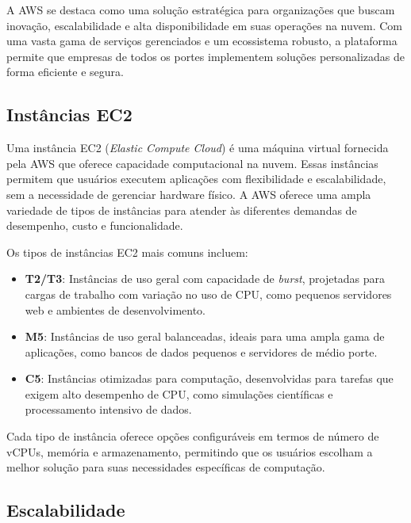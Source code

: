 A AWS se destaca como uma solução estratégica para organizações que buscam inovação, escalabilidade e alta disponibilidade em suas operações na nuvem. Com uma vasta gama de serviços gerenciados e um ecossistema robusto, a plataforma permite que empresas de todos os portes implementem soluções personalizadas de forma eficiente e segura.

\subsection{Instâncias EC2}


Uma instância EC2 (\emph{Elastic Compute Cloud}) é uma máquina virtual fornecida pela AWS que oferece capacidade computacional na nuvem. Essas instâncias permitem que usuários executem aplicações com flexibilidade e escalabilidade, sem a necessidade de gerenciar hardware físico. A AWS oferece uma ampla variedade de tipos de instâncias para atender às diferentes demandas de desempenho, custo e funcionalidade.

Os tipos de instâncias EC2 mais comuns incluem:

\begin{itemize}
    \item \textbf{T2/T3}: Instâncias de uso geral com capacidade de \emph{burst}, projetadas para cargas de trabalho com variação no uso de CPU, como pequenos servidores web e ambientes de desenvolvimento.
    \item \textbf{M5}: Instâncias de uso geral balanceadas, ideais para uma ampla gama de aplicações, como bancos de dados pequenos e servidores de médio porte.
    \item \textbf{C5}: Instâncias otimizadas para computação, desenvolvidas para tarefas que exigem alto desempenho de CPU, como simulações científicas e processamento intensivo de dados.
\end{itemize}

Cada tipo de instância oferece opções configuráveis em termos de número de vCPUs, memória e armazenamento, permitindo que os usuários escolham a melhor solução para suas necessidades específicas de computação.

\subsection{Escalabilidade}

